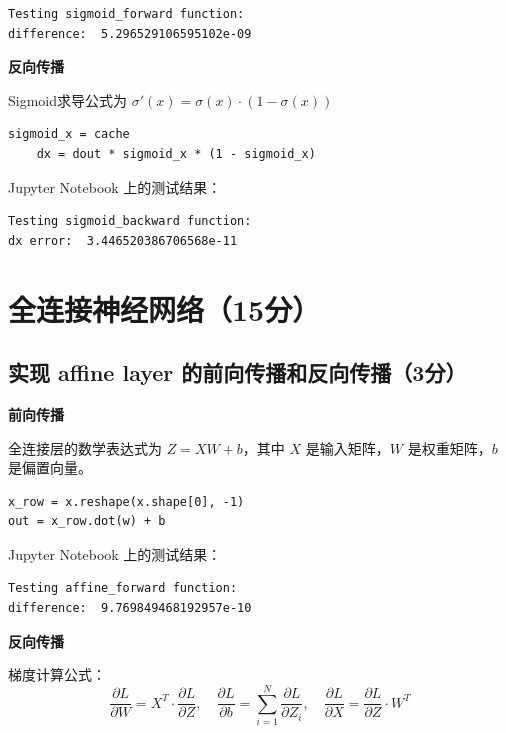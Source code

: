 \begin{lstlisting}[style=cleanpython]
Testing sigmoid_forward function:
difference:  5.296529106595102e-09
\end{lstlisting}

\textbf{反向传播}

Sigmoid求导公式为 $\sigma'(x) = \sigma(x) \cdot (1 - \sigma(x))$

\begin{lstlisting}[style=cleanpython]
    sigmoid_x = cache
    dx = dout * sigmoid_x * (1 - sigmoid_x)
\end{lstlisting}

Jupyter Notebook 上的测试结果：

\begin{lstlisting}[style=cleanpython]
Testing sigmoid_backward function:
dx error:  3.446520386706568e-11
\end{lstlisting}

\chapter{全连接神经网络（15分）}

\section{实现 affine layer 的前向传播和反向传播（3分）}

\textbf{前向传播}

全连接层的数学表达式为 $Z = XW + b$，其中 $X$ 是输入矩阵，$W$ 是权重矩阵，$b$ 是偏置向量。

\begin{lstlisting}[style=cleanpython]
x_row = x.reshape(x.shape[0], -1)
out = x_row.dot(w) + b
\end{lstlisting}

Jupyter Notebook 上的测试结果：

\begin{lstlisting}[style=cleanpython]
Testing affine_forward function:
difference:  9.769849468192957e-10
\end{lstlisting}

\textbf{反向传播}

梯度计算公式：
$$\frac{\partial L}{\partial W} = X^T \cdot \frac{\partial L}{\partial Z},\quad
\frac{\partial L}{\partial b} = \sum_{i=1}^{N} \frac{\partial L}{\partial Z_i},\quad
\frac{\partial L}{\partial X} = \frac{\partial L}{\partial Z} \cdot W^T$$

